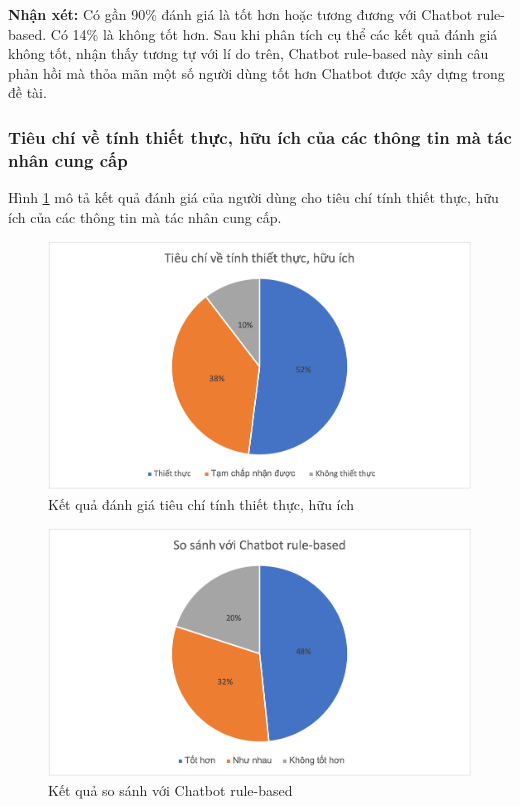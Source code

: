 \textbf{Nhận xét:}
Có gần 90\% đánh giá là tốt hơn hoặc tương đương với Chatbot rule-based.
Có 14\% là không tốt hơn. Sau khi phân tích cụ thể các kết quả đánh giá
không tốt, nhận thấy tương tự với lí do trên, Chatbot rule-based này sinh
câu phản hồi mà thỏa mãn một số người dùng tốt hơn Chatbot được
xây dựng trong đề tài.

\subsubsection{Tiêu chí về tính thiết thực, hữu ích của các thông tin
mà tác nhân cung cấp}
Hình \ref{fig:tieuchi4} mô tả kết quả đánh giá của người dùng cho tiêu chí
tính thiết thực, hữu ích của các thông tin mà tác nhân cung cấp.

\begin{figure}[ht!]
    \centering
    \includegraphics[scale=0.91]{thesis/chatbot/ketqua/img/tieuchi4.png}
    \caption{Kết quả đánh giá tiêu chí tính thiết thực, hữu ích}
    \label{fig:tieuchi4}
\end{figure}

\begin{figure}[ht!]
    \centering
    \includegraphics[scale=0.91]{thesis/chatbot/ketqua/img/tieuchi4_2.png}
    \caption{Kết quả so sánh với Chatbot rule-based}
    \label{fig:tieuchi42}
\end{figure}

